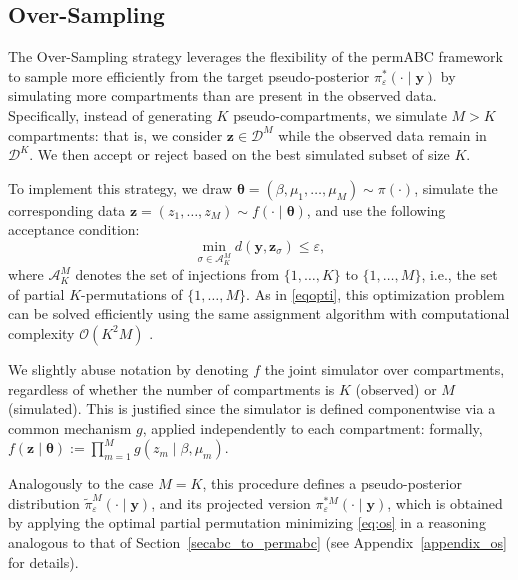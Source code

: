 \documentclass[lineno]{biometrika}
\def\dataspace{\mathcal{D}}
\def\globparam{\beta}
\def\locparam{\mu}
\def\obsdata{\mathbf{y}}
\def\param{\boldsymbol{\theta}}
\def\simdata{\mathbf{z}}
\begin{document}
\subsection{Over-Sampling}
\label{sec:permABC_OS}
The Over-Sampling strategy leverages the flexibility of the permABC framework to sample more efficiently from the target pseudo-posterior \( \pi_\varepsilon^*(\cdot \mid \obsdata) \) by simulating more compartments than are present in the observed data. Specifically, instead of generating \( K \) pseudo-compartments, we simulate \( M > K \) compartments: that is, we consider \( \simdata \in \dataspace^M \) while the observed data remain in \( \dataspace^K \). We then accept or reject based on the best simulated subset of size $K$.

To implement this strategy, we draw \( \param = (\globparam, \locparam_1, \dots, \locparam_M) \sim \pi(\cdot) \), simulate the corresponding data \( \simdata = (z_1, \dots, z_M) \sim f(\cdot \mid \param) \), and use the following acceptance condition:
\begin{equation}
    \label{eq:os}
    \min_{\sigma \in \mathcal{A}_K^M} d(\obsdata, \simdata_{\sigma}) \leq \varepsilon,
\end{equation}
where \( \mathcal{A}_K^M \) denotes the set of injections from \( \{1, \dots, K\} \) to \( \{1, \dots, M\} \), i.e., the set of partial \( K \)-permutations of \( \{1, \dots, M\} \). As in \eqref{eqopti}, this optimization problem can be solved efficiently using the same assignment algorithm with computational complexity \( \mathcal{O}(K^2 M) \) \citep{crouseImplementing2DRectangular2016a}.

We slightly abuse notation by denoting \( f \) the joint simulator over compartments, regardless of whether the number of compartments is \( K \) (observed) or \( M \) (simulated). This is justified since the simulator is defined componentwise via a common mechanism \( g \), applied independently to each compartment: formally, \( f(\simdata \mid \param) := \prod_{m=1}^M g(z_m \mid \globparam, \locparam_m) \).
 


Analogously to the case \( M = K \), this procedure defines a pseudo-posterior distribution \( \tilde{\pi}_\varepsilon^M(\cdot \mid \obsdata) \), and its projected version \( \pi_\varepsilon^{*M}(\cdot \mid \obsdata) \), which is obtained by applying the optimal partial permutation minimizing \eqref{eq:os} in a reasoning analogous to that of Section~\ref{secabc_to_permabc} (see Appendix~\ref{appendix_os} for details).
\end{document}
